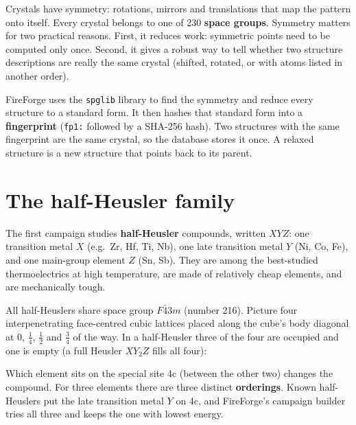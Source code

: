 \documentclass[11pt,a4paper]{report}
\newcommand{\code}[1]{\texttt{#1}}
\begin{document}
Crystals have symmetry: rotations, mirrors and translations that map the pattern onto
itself. Every crystal belongs to one of 230 \textbf{space groups}. Symmetry matters for two
practical reasons. First, it reduces work: symmetric points need to be computed only once.
Second, it gives a robust way to tell whether two structure descriptions are really the same
crystal (shifted, rotated, or with atoms listed in another order).

FireForge uses the \code{spglib} library to find the symmetry and reduce every structure to a
standard form. It then hashes that standard form into a \textbf{fingerprint}
(\code{fp1:} followed by a SHA-256 hash). Two structures with the same fingerprint are the same
crystal, so the database stores it once. A relaxed structure is a new structure that points
back to its parent.

\section{The half-Heusler family}

The first campaign studies \textbf{half-Heusler} compounds, written $XYZ$: one transition
metal $X$ (e.g.\ Zr, Hf, Ti, Nb), one late transition metal $Y$ (Ni, Co, Fe), and one main-group
element $Z$ (Sn, Sb). They are among the best-studied thermoelectrics at high temperature, are
made of relatively cheap elements, and are mechanically tough.

All half-Heuslers share space group $F\bar43m$ (number 216). Picture four interpenetrating
face-centred cubic lattices placed along the cube's body diagonal at $0$, $\tfrac14$,
$\tfrac12$ and $\tfrac34$ of the way. In a half-Heusler three of the four are occupied and one
is empty (a full Heusler $XY_2Z$ fills all four):

\begin{center}
\end{center}

Which element sits on the special site 4c (between the other two) changes the compound. For
three elements there are three distinct \textbf{orderings}. Known half-Heuslers put the late
transition metal $Y$ on 4c, and FireForge's campaign builder tries all three and keeps the one
with lowest energy.
\end{document}

